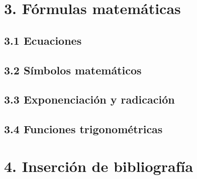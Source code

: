 \documentclass[letterpaper]{article}
\begin{document}
        

    \section*{3. F\'ormulas matem\'aticas}

        \subsection*{3.1 Ecuaciones}
        \subsection*{3.2 S\'imbolos matem\'aticos}
        \subsection*{3.3 Exponenciaci\'on y radicaci\'on}
        \subsection*{3.4 Funciones trigonom\'etricas}

    \section*{4. Inserci\'on de bibliograf\'ia}
\end{document}
